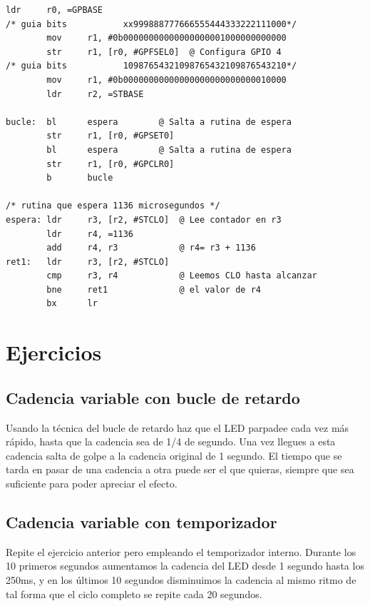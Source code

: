 \begin{lstlisting}[caption={Parte de esbn6.s},label={lst:codigoPract4_6}]
        ldr     r0, =GPBASE
/* guia bits           xx999888777666555444333222111000*/
        mov     r1, #0b00000000000000000001000000000000
        str     r1, [r0, #GPFSEL0]  @ Configura GPIO 4
/* guia bits           10987654321098765432109876543210*/
        mov     r1, #0b00000000000000000000000000010000
        ldr     r2, =STBASE

bucle:  bl      espera        @ Salta a rutina de espera
        str     r1, [r0, #GPSET0]
        bl      espera        @ Salta a rutina de espera
        str     r1, [r0, #GPCLR0]
        b       bucle

/* rutina que espera 1136 microsegundos */
espera: ldr     r3, [r2, #STCLO]  @ Lee contador en r3
        ldr     r4, =1136
        add     r4, r3            @ r4= r3 + 1136
ret1:   ldr     r3, [r2, #STCLO]
        cmp     r3, r4            @ Leemos CLO hasta alcanzar
        bne     ret1              @ el valor de r4
        bx      lr
\end{lstlisting}

\newpage
\section{Ejercicios}

\subsection{Cadencia variable con bucle de retardo}

Usando la técnica del bucle de retardo haz que el LED parpadee
cada vez más rápido, hasta que la cadencia sea de 1/4 de segundo.
Una vez llegues a esta cadencia salta de golpe a la cadencia
original de 1 segundo. El tiempo que se tarda en pasar de una
cadencia a otra puede ser el que quieras, siempre que sea
suficiente para poder apreciar el efecto.

\subsection{Cadencia variable con temporizador}

Repite el ejercicio anterior pero empleando el temporizador
interno. Durante los 10 primeros segundos aumentamos la cadencia
del LED desde 1 segundo hasta los 250ms, y en los últimos 10
segundos disminuimos la cadencia al mismo ritmo de tal forma
que el ciclo completo se repite cada 20 segundos.

